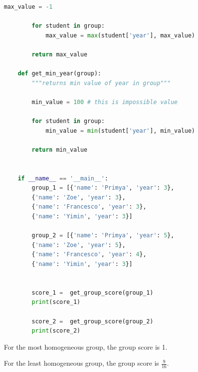 \documentclass[12pt]{article}
\begin{document}
\begin{itemize}
\begin{lstlisting}[language=Python]
        max_value = -1

        for student in group:
            max_value = max(student['year'], max_value)

        return max_value

    def get_min_year(group):
        """returns min value of year in group"""

        min_value = 100 # this is impossible value

        for student in group:
            min_value = min(student['year'], min_value)

        return min_value


    if __name__ == '__main__':
        group_1 = [{'name': 'Primya', 'year': 3},
        {'name': 'Zoe', 'year': 3},
        {'name': 'Francesco', 'year': 3},
        {'name': 'Yimin', 'year': 3}]

        group_2 = [{'name': 'Primya', 'year': 5},
        {'name': 'Zoe', 'year': 5},
        {'name': 'Francesco', 'year': 4},
        {'name': 'Yimin', 'year': 3}]


        score_1 =  get_group_score(group_1)
        print(score_1)

        score_2 =  get_group_score(group_2)
        print(score_2)


    \end{lstlisting}

    \bigskip

    For the most homogeneous group, the group score is 1.

    \bigskip

    For the least homogeneous group, the group score is $\frac{9}{16}$.

\end{itemize}

\bigskip
\end{document}

